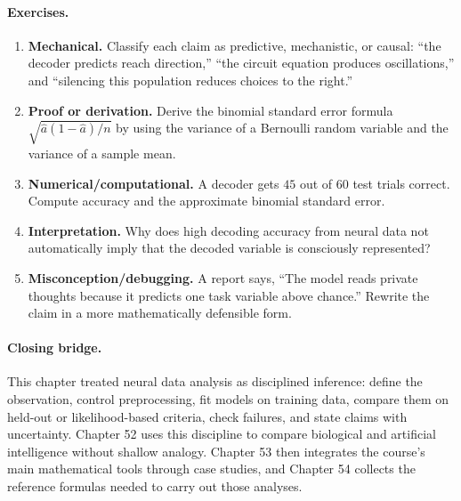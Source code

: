 \paragraph{Exercises.}
\begin{enumerate}[label=\textbf{51.4.\arabic*.}, leftmargin=*]
\item \textbf{Mechanical.} Classify each claim as predictive, mechanistic, or causal: ``the decoder predicts reach direction,'' ``the circuit equation produces oscillations,'' and ``silencing this population reduces choices to the right.''
\item \textbf{Proof or derivation.} Derive the binomial standard error formula \(\sqrt{\widehat a(1-\widehat a)/n}\) by using the variance of a Bernoulli random variable and the variance of a sample mean.
\item \textbf{Numerical/computational.} A decoder gets \(45\) out of \(60\) test trials correct. Compute accuracy and the approximate binomial standard error.
\item \textbf{Interpretation.} Why does high decoding accuracy from neural data not automatically imply that the decoded variable is consciously represented?
\item \textbf{Misconception/debugging.} A report says, ``The model reads private thoughts because it predicts one task variable above chance.'' Rewrite the claim in a more mathematically defensible form.
\end{enumerate}

\paragraph{Closing bridge.}
This chapter treated neural data analysis as disciplined inference: define the observation, control preprocessing, fit models on training data, compare them on held-out or likelihood-based criteria, check failures, and state claims with uncertainty. Chapter 52 uses this discipline to compare biological and artificial intelligence without shallow analogy. Chapter 53 then integrates the course's main mathematical tools through case studies, and Chapter 54 collects the reference formulas needed to carry out those analyses.

\clearpage

